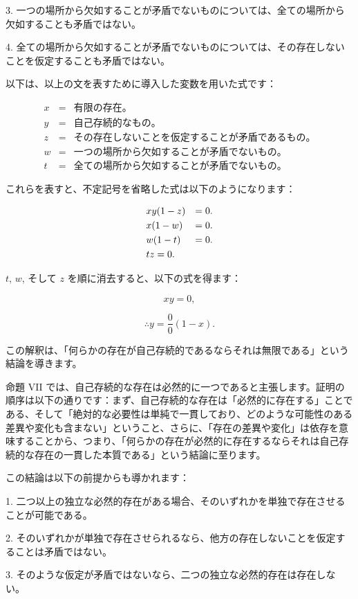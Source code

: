 \documentclass[a4paper,11pt,openany]{ltjsbook}
\begin{document}
3. 一つの場所から欠如することが矛盾でないものについては、全ての場所から欠如することも矛盾ではない。

4. 全ての場所から欠如することが矛盾でないものについては、その存在しないことを仮定することも矛盾ではない。

以下は、以上の文を表すために導入した変数を用いた式です：

\begin{eqnarray*}
x &=& \text{有限の存在。}\\
y &=& \text{自己存続的なもの。}\\
z &=& \text{その存在しないことを仮定することが矛盾であるもの。}\\
w &=& \text{一つの場所から欠如することが矛盾でないもの。}\\
t &=& \text{全ての場所から欠如することが矛盾でないもの。}
\end{eqnarray*}

これらを表すと、不定記号を省略した式は以下のようになります：

\begin{eqnarray}\setcounter{equation}{1}
&xy(1-z) &= 0.\\
&x(1-w)  &= 0.\\
&w(1-t)  &= 0.\\
&tz = 0.
\end{eqnarray}

$t$, $w$, そして $z$ を順に消去すると、以下の式を得ます：

\[
xy = 0,
\]

\[
\therefore y = \frac{0}{0}(1-x).
\]

この解釈は、「何らかの存在が自己存続的であるならそれは無限である」という結論を導きます。

命題 VII では、自己存続的な存在は必然的に一つであると主張します。証明の順序は以下の通りです：まず、自己存続的な存在は「必然的に存在する」ことである、そして「絶対的な必要性は単純で一貫しており、どのような可能性のある差異や変化も含まない」ということ、さらに、「存在の差異や変化」は依存を意味することから、つまり、「何らかの存在が必然的に存在するならそれは自己存続的な存在の一貫した本質である」という結論に至ります。

この結論は以下の前提からも導かれます：

1. 二つ以上の独立な必然的存在がある場合、そのいずれかを単独で存在させることが可能である。

2. そのいずれかが単独で存在させられるなら、他方の存在しないことを仮定することは矛盾ではない。

3. そのような仮定が矛盾ではないなら、二つの独立な必然的存在は存在しない。
\end{document}
